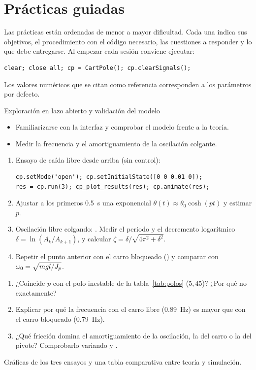 \chapter{Prácticas guiadas}
\label{cap:practicas}

Las prácticas están ordenadas de menor a mayor dificultad. Cada una indica sus objetivos, el procedimiento con el código necesario, las cuestiones a responder y lo que debe entregarse. Al empezar cada sesión conviene ejecutar:
\begin{lstlisting}
clear; close all; cp = CartPole(); cp.clearSignals();
\end{lstlisting}
Los valores numéricos que se citan como referencia corresponden a los parámetros por defecto.

\begin{practica}{Exploración en lazo abierto y validación del modelo}
\objetivos
\begin{itemize}
  \item Familiarizarse con la interfaz y comprobar el modelo frente a la teoría.
  \item Medir la frecuencia y el amortiguamiento de la oscilación colgante.
\end{itemize}
\procedimiento
\begin{enumerate}
  \item Ensayo de caída libre desde arriba (sin control):
\begin{lstlisting}
cp.setMode('open'); cp.setInitialState([0 0 0.01 0]);
res = cp.run(3); cp_plot_results(res); cp.animate(res);
\end{lstlisting}
  \item Ajustar a los primeros \SI{0.5}{s} una exponencial $\theta(t)\approx\theta_0\cosh(pt)$ y estimar $p$.
  \item Oscilación libre colgando: . Medir el periodo y el decremento logarítmico $\delta=\ln(A_k/A_{k+1})$, y calcular $\zeta=\delta/\sqrt{4\pi^2+\delta^2}$.
  \item Repetir el punto anterior con el carro bloqueado () y comparar con $\omega_0=\sqrt{mgl/J_p}$.
\end{enumerate}
\preguntas
\begin{enumerate}
  \item ¿Coincide $p$ con el polo inestable de la tabla~\ref{tab:polos} ($5{,}45$)? ¿Por qué no exactamente?
  \item Explicar por qué la frecuencia con el carro libre (\SI{0.89}{Hz}) es mayor que con el carro bloqueado (\SI{0.79}{Hz}).
  \item ¿Qué fricción domina el amortiguamiento de la oscilación, la del carro o la del pivote? Comprobarlo variando  y .
\end{enumerate}
\entregables Gráficas de los tres ensayos y una tabla comparativa entre teoría y simulación.
\end{practica}


